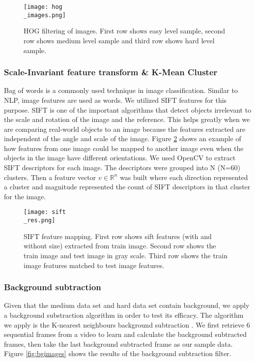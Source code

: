 \documentclass[
	a4paper, %
	10pt, %
	unnumberedsections, %
	twoside, %
]{t0004}
\begin{document}
\begin{figure}
	\texttt{[image: hog\\\_images.png]}
	\caption{HOG filtering of images. First row shows easy level sample, second row shows medium level sample and third row shows hard level sample.}
	\label{fig:hogimages}
\end{figure}

\subsubsection{Scale-Invariant feature transform \& K-Mean Cluster} Bag of words is a commonly used technique in image classification. Similar to NLP, image features are used as words. We utilized SIFT features for this purpose. SIFT is one of the important algorithms that detect objects irrelevant to the scale and rotation of the image and the reference. This helps greatly when we are comparing real-world objects to an image because the features extracted are independent of the angle and scale of the image. Figure \ref{fig:siftres} shows an example of how features from one image could be mapped to another image even when the objects in the image have different orientations. We used OpenCV to extract SIFT descriptors for each image. The descriptors were grouped into N (N=60) clusters. Then a feature vector \(v \in \mathbb{R}^n\) was built where each direction represented a cluster and magnitude represented the count of SIFT descriptors in that cluster for the image.

\begin{figure}
	\texttt{[image: sift\\\_res.png]}
	\caption{SIFT feature mapping. First row shows sift features (with and without size) extracted from train image. Second row shows the train image and test image in gray scale. Third row shows the train image features matched to test image features.}
	\label{fig:siftres}
\end{figure}

\subsubsection{Background subtraction} Given that the medium data set and hard data set contain background, we apply a background substraction algorithm in order to test its efficacy. The algorithm we apply is the K-nearest neighbours background subtraction \cite{Zivkovic:2006qr}. We first retrieve 6 sequential frames from a video to learn and calculate the background subtracted frames, then take the last background subtracted frame as our sample data. Figure \ref{fig:bgimages} shows the results of the background subtraction filter.
\end{document}
